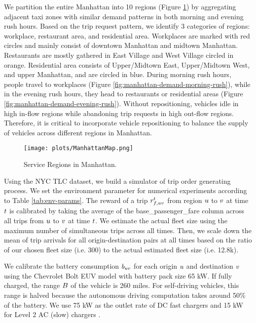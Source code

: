 We partition the entire Manhattan into 10 regions (Figure \ref{fig:map}) by aggregating adjacent taxi zones with similar demand patterns in both morning and evening rush hours. Based on the trip request pattern, we identify 3 categories of regions: workplace, restaurant area, and residential area.  Workplaces are marked with red circles and mainly consist of downtown Manhattan and midtown Manhattan. Restaurants are mostly gathered in East Village and West Village circled in orange. Residential area consists of Upper/Midtown East, Upper/Midtown West, and upper Manhattan, and are circled in blue. During morning rush hours, people travel to workplaces (Figure \ref{fig:manhattan-demand-morning-rush}), while in the evening rush hours, they head to restaurants or residential areas (Figure \ref{fig:manhattan-demand-evening-rush}). Without repositioning, vehicles idle in high in-flow regions while abandoning trip requests in high out-flow regions. Therefore, it is critical to incorporate vehicle repositioning to balance the supply of vehicles across different regions in Manhattan.

\begin{figure}[h]
    \centering
    \texttt{[image: plots/ManhattanMap.png]}
    \caption{Service Regions in Manhattan.}
    \label{fig:map}
\end{figure}

Using the NYC TLC dataset, we build a simulator of trip order generating process. We set the environment parameter for numerical experiments according to Table \ref{tab:env-params}. The reward of a trip $r^{t}_{f ,u v}$ from region $u$ to $v$ at time $t$ is calibrated by taking the average of the base\_passenger\_fare column across all trips from $u$ to $v$ at time $t$. We estimate the actual fleet size using the maximum number of simultaneous trips across all times. Then, we scale down the mean of trip arrivals for all origin-destination pairs at all times based on the ratio of our chosen fleet size (i.e. 300) to the actual estimated fleet size (i.e. 12.8k). %

We calibrate the battery consumption $b_{uv}$ for each origin $u$ and destination $v$ using the Chevrolet Bolt EUV model with battery pack size 65 kW. If fully charged, the range $B$ of the vehicle is 260 miles. For self-driving vehicles, this range is halved because the autonomous driving computation takes around 50\% of the battery. We use 75 kW as the outlet rate of DC fast chargers and 15 kW for Level 2 AC (slow) chargers \cite{afsl, evinfra}. 

